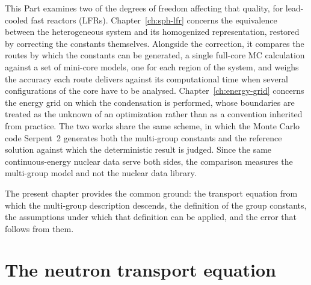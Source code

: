 This Part examines two of the degrees of freedom affecting that quality, for
lead-cooled fast reactors (LFRs). Chapter~\ref{ch:sph-lfr} concerns the
equivalence between the heterogeneous system and its homogenized representation,
restored by correcting the constants themselves. Alongside the correction, it
compares the routes by which the constants can be generated, a single full-core
MC calculation against a set of mini-core models, one for each region
of the system, and weighs the accuracy each route delivers
against its computational time when several configurations of the core
have to be analysed. Chapter~\ref{ch:energy-grid} concerns the energy grid on
which the condensation is performed, whose boundaries are treated as the unknown
of an optimization rather than as a convention inherited from practice. The two
works share the same scheme, in which the Monte Carlo code Serpent~2
\cite{Serpent_code_description,Serpent_homog_technique} generates both the
multi-group constants and the reference solution against which the deterministic
result is judged. Since the same continuous-energy nuclear data serve both
sides, the comparison measures the multi-group model and not the nuclear data
library.

The present chapter provides the common ground: the transport equation from
which the multi-group description descends, the definition of the group
constants, the assumptions under which that definition can be applied, and the
error that follows from them.

\section{The neutron transport equation}

